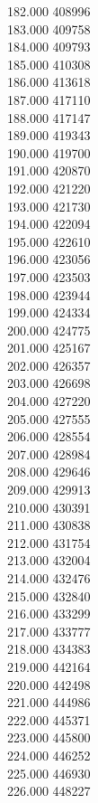 { 182.000	408996 \\
 183.000	409758 \\
 184.000	409793 \\
 185.000	410308 \\
 186.000	413618 \\
 187.000	417110 \\
 188.000	417147 \\
 189.000	419343 \\
 190.000	419700 \\
 191.000	420870 \\
 192.000	421220 \\
 193.000	421730 \\
 194.000	422094 \\
 195.000	422610 \\
 196.000	423056 \\
 197.000	423503 \\
 198.000	423944 \\
 199.000	424334 \\
 200.000	424775 \\
 201.000	425167 \\
 202.000	426357 \\
 203.000	426698 \\
 204.000	427220 \\
 205.000	427555 \\
 206.000	428554 \\
 207.000	428984 \\
 208.000	429646 \\
 209.000	429913 \\
 210.000	430391 \\
 211.000	430838 \\
 212.000	431754 \\
 213.000	432004 \\
 214.000	432476 \\
 215.000	432840 \\
 216.000	433299 \\
 217.000	433777 \\
 218.000	434383 \\
 219.000	442164 \\
 220.000	442498 \\
 221.000	444986 \\
 222.000	445371 \\
 223.000	445800 \\
 224.000	446252 \\
 225.000	446930 \\
 226.000	448227 \\
}
